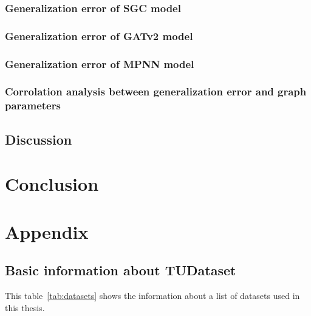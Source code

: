 \documentclass{article}
\begin{document}
\newpage

\subsubsection{Generalization error of SGC model}

\subsubsection{Generalization error of GATv2 model}

\subsubsection{Generalization error of MPNN model}

\subsubsection{Corrolation analysis between generalization error and graph parameters}



\subsection{Discussion}

\section{Conclusion}




\clearpage



\clearpage

\section{Appendix} 
 
\subsection{Basic information about TUDataset}\label{sec:datasets}
This table~\ref{tab:datasets} shows the information about a list of datasets used in this thesis.
\end{document}
